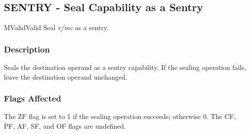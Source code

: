 \clearpage
{}
{}
\subsection*{SENTRY - Seal Capability as a Sentry}

\begin{x86opcodetable}
  {M}{Valid}{Valid}
  {Seal \emph{r/mc} as a sentry.}
\end{x86opcodetable}

\begin{x86opentable}
\end{x86opentable}

\subsubsection*{Description}

Seals the destination operand as a sentry capability.  If the sealing
operation fails, leave the destination operand unchanged.

\subsubsection*{Flags Affected}

The ZF flag is set to 1 if the sealing operation succeeds; otherwise
0.  The CF, PF, AF, SF, and OF flags are undefined.

